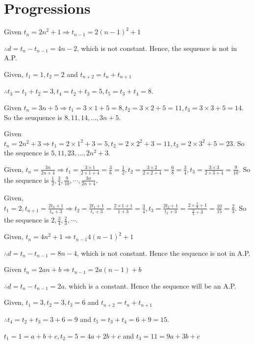 \chapter{Progressions}
\startitemize[n, 2*broad]
\item Given $t_n = 2n^2 + 1 \Rightarrow t_{n - 1} = 2(n - 1)^2 + 1$

  $\therefore d = t_n - t_{n - 1} = 4n - 2$, which is not constant. Hence, the sequence is not in A.P.
\item Given, $t_1 = 1, t_2 = 2$ and $t_{n+2} = t_n + t_{n + 1}$

  $\therefore t_3 = t_1 + t_2 = 3, t_4 = t_2 + t_3 = 5, t_5 = t_3 + t_4 = 8$.
\item Given $t_n = 3n + 5 \Rightarrow t_1 = 3\times1 + 5 = 8, t_2 = 3\times2 + 5 = 11, t_3 = 3\times3 + 5 = 14$. So the seuquence
  is $8, 11, 14, \ldots, 3n + 5$.
\item Given $t_n = 2n^2 + 3 \Rightarrow t_1 = 2\times1^2 + 3 = 5, t_2 = 2\times2^2 + 3 = 11, t_3 = 2\times3^2 + 5 = 23$. So the
  sequence is $5, 11, 23, \ldots, 2n^2 + 3$.
\item Given, $t_n = \frac{3n}{2n + 4}\Rightarrow t_1 = \frac{3\times1}{2\times1 + 4} = \frac{3}{6} = \frac{1}{2}, t_2 =
  \frac{3\times2}{2\times2 + 4} = \frac{6}{8} = \frac{3}{4}, t_3 = \frac{3\times3}{2\times3 + 4} = \frac{9}{10}$. So the
  sequence is $\frac{1}{2}, \frac{3}{4}, \frac{9}{10}, \cdots, \frac{3n}{2n + 4}$.
\item Given, $t_1 = 2, t_{n + 1} = \frac{2t_n + 1}{t_n + 3} \Rightarrow t_2 = \frac{2t_1 + 1}{t_1 + 3} = \frac{2\times1 + 1}{1 + 3}
  = \frac{3}{4}, t_3 = \frac{2t_2 + 1}{t_2 + 3} = \frac{2\times\tfrac{3}{4} + 1}{\tfrac{3}{4} + 3} = \frac{10}{15} = \frac{2}{3}$.
  So the sequence is $2, \frac{3}{4}, \frac{2}{3}, \cdots$.
\item Given, $t_n = 4n^2 + 1 \Rightarrow t_{n - 1} 4(n - 1)^2 + 1$

  $\therefore d = t_n - t_{n - 1} = 8n - 4$, which is not constant. Hence the sequence is not in A.P.
\item Given $t_n = 2an + b \Rightarrow t_{n - 1} = 2a(n - 1) + b$

  $\therefore d = t_n - t_{n - 1} = 2a$. which is a constant. Hence the sequence will be an A.P.
\item Given, $t_1 = 3, t_2 = 3, t_3 = 6$ and $t_{n + 2} = t_n + t_{n + 1}$

  $\therefore t_4 = t_2 + t_3 = 3 + 6 = 9$ and $t_5 = t_3 + t_4 = 6 + 9 = 15$.
\item $t_1 = 1 = a + b + c, t_2 = 5 = 4a + 2b + c$ and $t_3 = 11 = 9a + 3b + c$

